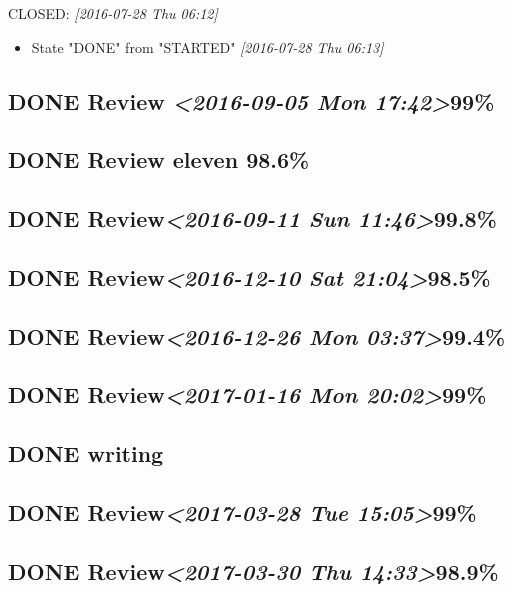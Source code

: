 \documentclass[11pt]{ctexart}
\begin{document}
CLOSED: \textit{[2016-07-28 Thu 06:12]}
\begin{itemize}
\item State "DONE"       from "STARTED"    \textit{[2016-07-28 Thu 06:13]}
\end{itemize}

\subsection{{\bfseries\sffamily DONE} Review \textit{<2016-09-05 Mon 17:42>}99\%}
\label{sec:orgcc346fd}
\subsection{{\bfseries\sffamily DONE} Review eleven 98.6\%}
\label{sec:orgee74488}

\subsection{{\bfseries\sffamily DONE} Review\textit{<2016-09-11 Sun 11:46>}99.8\%}
\label{sec:orga9e9ef2}
\subsection{{\bfseries\sffamily DONE} Review\textit{<2016-12-10 Sat 21:04>}98.5\%}
\label{sec:orgba50ff9}
\subsection{{\bfseries\sffamily DONE} Review\textit{<2016-12-26 Mon 03:37>}99.4\%}
\label{sec:orgb171af8}


\subsection{{\bfseries\sffamily DONE} Review\textit{<2017-01-16 Mon 20:02>}99\%}
\label{sec:orgb370af6}
\subsection{{\bfseries\sffamily DONE} writing}
\label{sec:org7c82b5d}
\subsection{{\bfseries\sffamily DONE} Review\textit{<2017-03-28 Tue 15:05>}99\%}
\label{sec:org2059b94}
\subsection{{\bfseries\sffamily DONE} Review\textit{<2017-03-30 Thu 14:33>}98.9\%}
\label{sec:org1b1d8e3}
\end{document}
